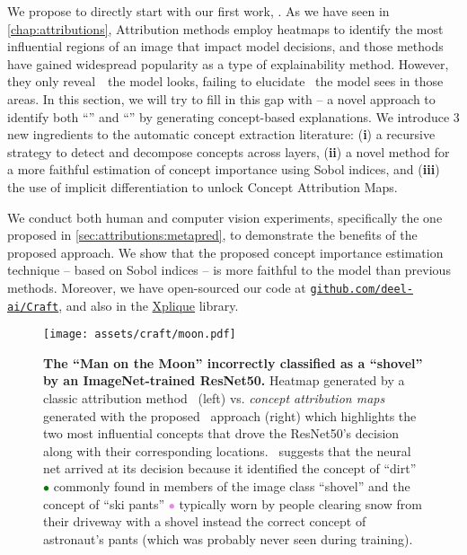
We propose to directly start with our first work, \craft. As we have seen in \autoref{chap:attributions}, Attribution methods employ heatmaps to identify the most influential regions of an image that impact model decisions, and those methods have gained widespread popularity as a type of explainability method.
However, they only reveal~\where~the model looks, failing to elucidate \what~the model sees in those areas.
In this section, we will try to fill in this gap with \craft -- a novel approach to identify both ``\what'' and ``\where'' by generating concept-based explanations.
We introduce 3 new ingredients to the automatic concept extraction literature: (\textbf{i}) a recursive strategy to detect and decompose concepts across layers, (\textbf{ii}) a novel method for a more faithful estimation of concept importance using Sobol indices, and (\textbf{iii}) the use of implicit differentiation to unlock Concept Attribution Maps.

We conduct both human and computer vision experiments, specifically the one proposed in \autoref{sec:attributions:metapred}, to demonstrate the benefits of the proposed approach. We show that the proposed concept importance estimation technique -- based on Sobol indices -- is more faithful to the model than previous methods. Moreover, we have open-sourced our code at
\href{https://github.com/deel-ai/Craft}{\nolinkurl{github.com/deel-ai/Craft}}, and also in the \href{https://github.com/deel-ai/xplique}{Xplique} library.

\begin{figure}[ht]\centering
\texttt{[image: assets/craft/moon.pdf]}
\caption{\textbf{The ``Man on the Moon'' incorrectly classified as a ``shovel'' by an ImageNet-trained ResNet50.} Heatmap generated by a classic attribution method~\cite{petsiuk2018rise} (left) vs.  \textit{concept attribution maps} generated with the proposed \craft~approach (right) which highlights the two most influential concepts that drove the ResNet50's decision along with their corresponding locations. 
\craft~suggests that the neural net arrived at its decision because it identified the concept of ``dirt'' \textcolor{green}{$\bullet$} commonly found in members of the image class ``shovel'' and the concept of ``ski pants'' \textcolor{violet}{$\bullet$} typically worn by people clearing snow from their driveway with a shovel instead the correct concept of astronaut's pants (which was probably never seen during training).
}
\label{fig:craft:shovel}
\end{figure}


